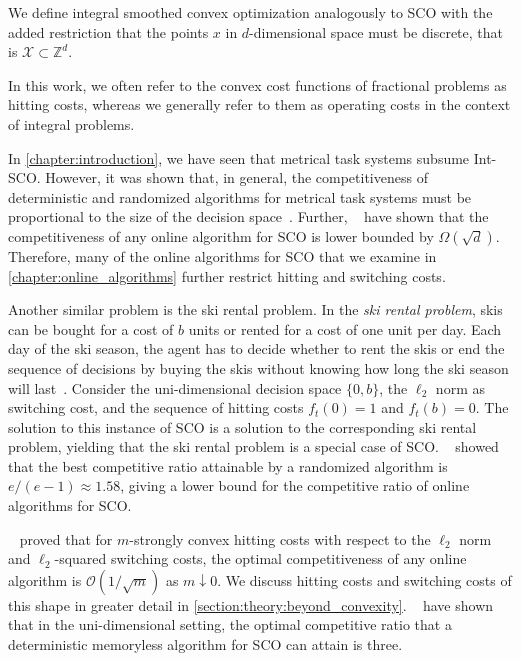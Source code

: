 \begin{problem}
We define integral smoothed convex optimization analogously to SCO with the added restriction that the points $x$ in $d$-dimensional space must be discrete, that is $\mathcal{X} \subset \mathbb{Z}^d$.
\end{problem}

In this work, we often refer to the convex cost functions of fractional problems as hitting costs, whereas we generally refer to them as operating costs in the context of integral problems.

In \cref{chapter:introduction}, we have seen that metrical task systems subsume Int-SCO. However, it was shown that, in general, the competitiveness of deterministic and randomized algorithms for metrical task systems must be proportional to the size of the decision space~\cite{Blum1992, Borodin1992}. Further, \citeauthor*{Chen2018}~\cite{Chen2018} have shown that the competitiveness of any online algorithm for SCO is lower bounded by $\Omega(\sqrt{d})$. Therefore, many of the online algorithms for SCO that we examine in \cref{chapter:online_algorithms} further restrict hitting and switching costs.

Another similar problem is the ski rental problem. In the \emph{ski rental problem}, skis can be bought for a cost of $b$ units or rented for a cost of one unit per day. Each day of the ski season, the agent has to decide whether to rent the skis or end the sequence of decisions by buying the skis without knowing how long the ski season will last~\cite{Shah2021}. Consider the uni-dimensional decision space $\{0,b\}$, the $\ell_2$ norm as switching cost, and the sequence of hitting costs $f_t(0) = 1$ and $f_t(b) = 0$. The solution to this instance of SCO is a solution to the corresponding ski rental problem, yielding that the ski rental problem is a special case of SCO. \citeauthor*{Karlin1990}~\cite{Karlin1990} showed that the best competitive ratio attainable by a randomized algorithm is $e/(e-1) \approx 1.58$, giving a lower bound for the competitive ratio of online algorithms for SCO.

\citeauthor*{Goel2019}~\cite{Goel2019} proved that for $m$-strongly convex hitting costs with respect to the $\ell_2$ norm and $\ell_2$-squared switching costs, the optimal competitiveness of any online algorithm is $\mathcal{O}(1/\sqrt{m})$ as $m \downarrow 0$. We discuss hitting costs and switching costs of this shape in greater detail in \cref{section:theory:beyond_convexity}. \citeauthor*{Bansal2015}~\cite{Bansal2015} have shown that in the uni-dimensional setting, the optimal competitive ratio that a deterministic memoryless algorithm for SCO can attain is three.

